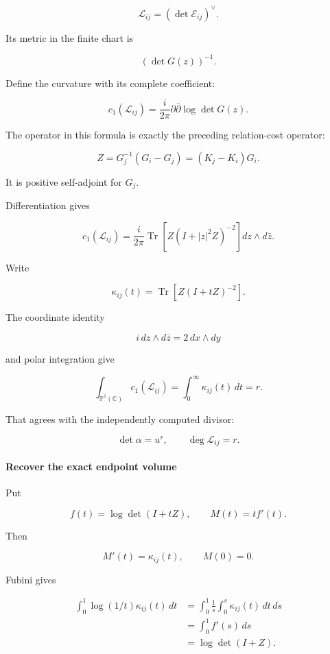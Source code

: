 \[
\mathscr L_{ij}=(\det\mathscr E_{ij})^\vee.
\]

Its metric in the finite chart is

\[
(\det G(z))^{-1}.
\]

Define the curvature with its complete coefficient:

\[
\boxed{
c_1(\mathscr L_{ij})
=
\frac{i}{2\pi}\partial\bar\partial\log\det G(z).
}
\]

The operator in this formula is exactly the preceding relation-cost operator:

\[
\boxed{
Z=G_j^{-1}(G_i-G_j)
=(K_j-K_i)G_i.
}
\]

It is positive self-adjoint for \(G_j\).

Differentiation gives

\[
\boxed{
c_1(\mathscr L_{ij})
=
\frac{i}{2\pi}
\operatorname{Tr}\!\left[
Z(I+|z|^2Z)^{-2}
\right]dz\wedge d\bar z.
}
\]

Write

\[
\kappa_{ij}(t)
=
\operatorname{Tr}\!\left[Z(I+tZ)^{-2}\right].
\]

The coordinate identity

\[
i\,dz\wedge d\bar z=2\,dx\wedge dy
\]

and polar integration give

\[
\boxed{
\int_{\mathbb P^1(\mathbb C)}c_1(\mathscr L_{ij})
=
\int_0^\infty\kappa_{ij}(t)\,dt
=
r.
}
\]

That agrees with the independently computed divisor:

\[
\det\alpha=u^r,\qquad \deg\mathscr L_{ij}=r.
\]

\paragraph{Recover the exact endpoint volume}\label{endpoint-curvature_original--recover-the-exact-endpoint-volume}

Put

\[
f(t)=\log\det(I+tZ),
\qquad
M(t)=tf'(t).
\]

Then

\[
M'(t)=\kappa_{ij}(t),\qquad M(0)=0.
\]

Fubini gives

\[
\begin{aligned}
\int_0^1\log(1/t)\kappa_{ij}(t)\,dt
&=\int_0^1\frac1s\int_0^s\kappa_{ij}(t)\,dt\,ds\\
&=\int_0^1f'(s)\,ds\\
&=\log\det(I+Z).
\end{aligned}
\]


